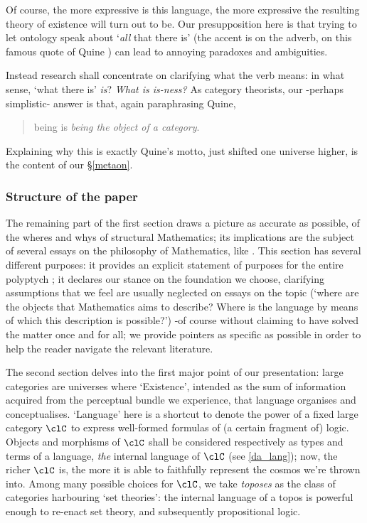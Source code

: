 Of course, the more expressive is this language, the more expressive the resulting theory of existence will turn out to be. Our presupposition here is that trying to let ontology speak about `\emph{all} that there is' (the accent is on the adverb, on this famous quote of Quine \cite{quine1948there}) can lead to annoying paradoxes and ambiguities. 

Instead research shall concentrate on clarifying what the verb means: in what sense, `what there is' \emph{is}? \emph{What is is-ness?} As category theorists, our -perhaps simplistic- answer is that, again paraphrasing Quine,
\begin{quote}
	being is \emph{being the object of a category}.
\end{quote}
Explaining why this is exactly Quine's motto, just shifted one universe higher, is the content of our §\ref{metaon}.
\subsubsection{Structure of the paper}
The remaining part of the first section draws a picture as accurate as possible, of the wheres and whys of structural Mathematics; its implications are the subject of several essays on the philosophy of Mathematics, like \cite{kromer2007tool,Marquis1997,marquis2010category,marquis2008geometrical}. This section has several different purposes: it provides an explicit statement of purposes for the entire polyptych \cite{black,homot}; it declares our stance on the foundation we choose, clarifying assumptions that we feel are usually neglected on essays on the topic (`where are the objects that Mathematics aims to describe? Where is the language by means of which this description is possible?') -of course without claiming to have solved the matter once and for all; we provide pointers as specific as possible in order to help the reader navigate the relevant literature.

The second section delves into the first major point of our presentation: large categories are universes where `Existence', intended as the sum of information acquired from the perceptual bundle we experience, that language organises and conceptualises. `Language' here is a shortcut to denote the power of a fixed large category $\clC$ to express well-formed formulas of (a certain fragment of) logic. Objects and morphisms of $\clC$ shall be considered respectively as types and terms of a language, \emph{the} internal language of $\clC$ (see \autoref{da_lang}); now, the richer $\clC$ is, the more it is able to faithfully represent the cosmos we're thrown into. Among many possible choices for $\clC$, we take \emph{toposes} as the class of categories harbouring `set theories': the internal language of a topos is powerful enough to re-enact set theory, and subsequently propositional logic.

